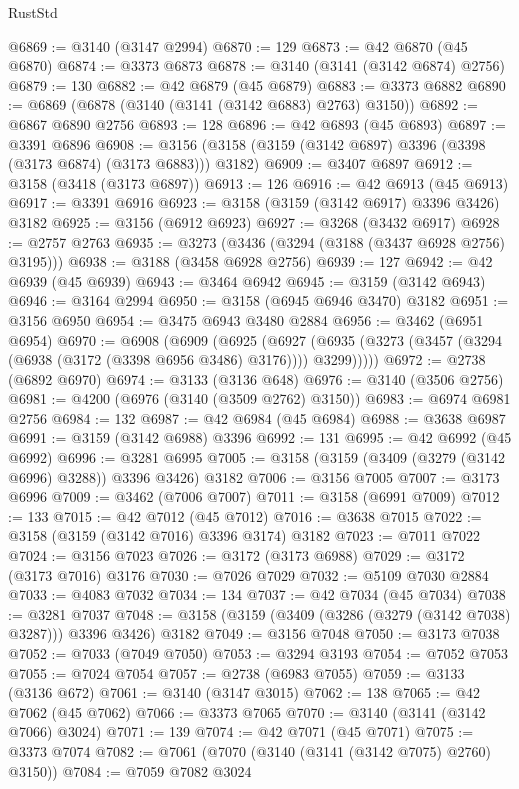 \begin{lexlean}{RustStd}
\begin{coremodule}
@6869 := @3140 (@3147 @2994)
@6870 := 129
@6873 := @42 @6870 (@45 @6870)
@6874 := @3373 @6873
@6878 := @3140 (@3141 (@3142 @6874) @2756)
@6879 := 130
@6882 := @42 @6879 (@45 @6879)
@6883 := @3373 @6882
@6890 := @6869 (@6878 (@3140 (@3141 (@3142 @6883) @2763) @3150))
@6892 := @6867 @6890 @2756
@6893 := 128
@6896 := @42 @6893 (@45 @6893)
@6897 := @3391 @6896
@6908 := @3156 (@3158 (@3159 (@3142 @6897) @3396 (@3398 (@3173 @6874) (@3173 @6883))) @3182)
@6909 := @3407 @6897
@6912 := @3158 (@3418 (@3173 @6897))
@6913 := 126
@6916 := @42 @6913 (@45 @6913)
@6917 := @3391 @6916
@6923 := @3158 (@3159 (@3142 @6917) @3396 @3426) @3182
@6925 := @3156 (@6912 @6923)
@6927 := @3268 (@3432 @6917)
@6928 := @2757 @2763
@6935 := @3273 (@3436 (@3294 (@3188 (@3437 @6928 @2756) @3195)))
@6938 := @3188 (@3458 @6928 @2756)
@6939 := 127
@6942 := @42 @6939 (@45 @6939)
@6943 := @3464 @6942
@6945 := @3159 (@3142 @6943)
@6946 := @3164 @2994
@6950 := @3158 (@6945 @6946 @3470) @3182
@6951 := @3156 @6950
@6954 := @3475 @6943 @3480 @2884
@6956 := @3462 (@6951 @6954)
@6970 := @6908
    (@6909
      (@6925
        (@6927 (@6935 (@3273 (@3457 (@3294 (@6938 (@3172 (@3398 @6956 @3486) @3176)))) @3299)))))
@6972 := @2738 (@6892 @6970)
@6974 := @3133 (@3136 @648)
@6976 := @3140 (@3506 @2756)
@6981 := @4200 (@6976 (@3140 (@3509 @2762) @3150))
@6983 := @6974 @6981 @2756
@6984 := 132
@6987 := @42 @6984 (@45 @6984)
@6988 := @3638 @6987
@6991 := @3159 (@3142 @6988) @3396
@6992 := 131
@6995 := @42 @6992 (@45 @6992)
@6996 := @3281 @6995
@7005 := @3158 (@3159 (@3409 (@3279 (@3142 @6996) @3288)) @3396 @3426) @3182
@7006 := @3156 @7005
@7007 := @3173 @6996
@7009 := @3462 (@7006 @7007)
@7011 := @3158 (@6991 @7009)
@7012 := 133
@7015 := @42 @7012 (@45 @7012)
@7016 := @3638 @7015
@7022 := @3158 (@3159 (@3142 @7016) @3396 @3174) @3182
@7023 := @7011 @7022
@7024 := @3156 @7023
@7026 := @3172 (@3173 @6988)
@7029 := @3172 (@3173 @7016) @3176
@7030 := @7026 @7029
@7032 := @5109 @7030 @2884
@7033 := @4083 @7032
@7034 := 134
@7037 := @42 @7034 (@45 @7034)
@7038 := @3281 @7037
@7048 := @3158 (@3159 (@3409 (@3286 (@3279 (@3142 @7038) @3287))) @3396 @3426) @3182
@7049 := @3156 @7048
@7050 := @3173 @7038
@7052 := @7033 (@7049 @7050)
@7053 := @3294 @3193
@7054 := @7052 @7053
@7055 := @7024 @7054
@7057 := @2738 (@6983 @7055)
@7059 := @3133 (@3136 @672)
@7061 := @3140 (@3147 @3015)
@7062 := 138
@7065 := @42 @7062 (@45 @7062)
@7066 := @3373 @7065
@7070 := @3140 (@3141 (@3142 @7066) @3024)
@7071 := 139
@7074 := @42 @7071 (@45 @7071)
@7075 := @3373 @7074
@7082 := @7061 (@7070 (@3140 (@3141 (@3142 @7075) @2760) @3150))
@7084 := @7059 @7082 @3024

\end{coremodule}
\end{lexlean}
